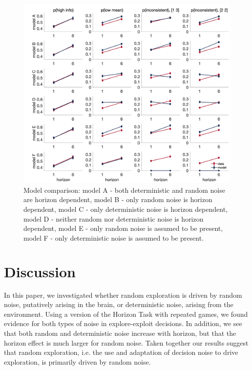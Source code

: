 \documentclass[12pt]{article}
\begin{document}
	\begin{figure}[H]
		\begin{center}
			\includegraphics[width=1\textwidth]{figures/RanDetNoise_2noise_6modelcomparison.png}
			\caption{Model comparison: model A - both deterministic and random noise are horizon dependent, model B - only random noise is horizon dependent, model C - only deterministic noise is horizon dependent, model D - neither random nor deterministic noise is horizon dependent, model E - only random noise is assumed to be present, model F - only deterministic noise is assumed to be present.}
			\label{fig:mb3}
		\end{center}
	\end{figure}
	
	\section*{Discussion}
	In this paper, we investigated whether random exploration is driven by random noise, putatively arising in the brain, or deterministic noise, arising from the environment. Using a version of the Horizon Task with repeated games, we found evidence for both types of noise in explore-exploit decisions. In addition, we see that both random and deterministic noise increase with horizon, but that the horizon effect is much larger for random noise.  Taken together our results suggest that random exploration, i.e. the use and adaptation of decision noise to drive exploration, is primarily driven by random noise.
\end{document}
